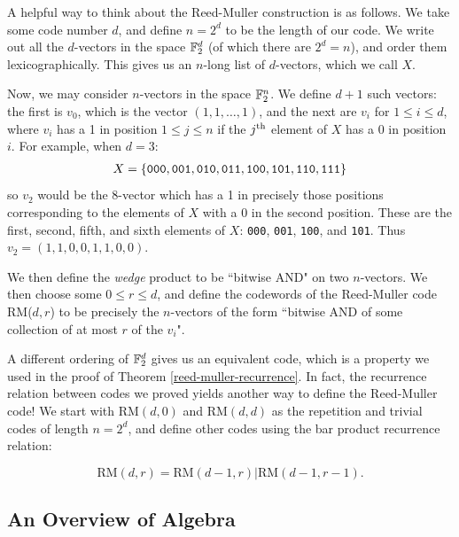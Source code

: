 \documentclass{article}
\begin{document}
\begin{remark}
    A helpful way to think about the Reed-Muller construction is as follows.
    We take some code number $d$, and define $n = 2^d$ to be the length of our code.
    We write out all the $d$-vectors in the space $\mathbb{F}_2^d$ (of which there are $2^d = n$), and order them lexicographically. This gives us an $n$-long list of $d$-vectors, which we call $X$.
    
    Now, we may consider $n$-vectors in the space $\mathbb{F}_2^n$. We define $d+1$ such vectors: the first is $v_0$, which is the vector $(1, 1, \dots, 1)$, and the next are $v_i$ for $1 \leq i \leq d$, where $v_i$ has a 1 in position $1 \leq j \leq n$ if the $j^{\text{th}}$ element of $X$ has a 0 in position $i$. For example, when $d = 3$:
    \begin{align*}
    	X = \left\lbrace 
		\texttt{000}, \texttt{001}, \texttt{010}, \texttt{011},
		\texttt{100}, \texttt{101}, \texttt{110}, \texttt{111}
		 \right\rbrace
	\end{align*}
	so $v_2$ would be the 8-vector which has a 1 in precisely those positions corresponding to the elements of $X$ with a 0 in the second position. These are the first, second, fifth, and sixth elements of $X$: 
	\texttt{000}, \texttt{001}, \texttt{100}, and \texttt{101}. Thus $v_2 = (1, 1, 0, 0, 1, 1, 0, 0)$.
	
	We then define the \textit{wedge} product to be ``bitwise AND" on two $n$-vectors. We then choose some $0 \leq r \leq d$, and define the codewords of the Reed-Muller code RM($d, r$) to be precisely the $n$-vectors of the form ``bitwise AND of some collection of at most $r$ of the $v_i$".
\end{remark}

\begin{note}
	A different ordering of $\mathbb{F}_2^d$ gives us an equivalent code, which is a property we used in the proof of Theorem \ref{reed-muller-recurrence}. In fact, the recurrence relation between codes we proved yields another way to define the Reed-Muller code! We start with $\mathrm{RM}(d, 0)$ and $\mathrm{RM}(d, d)$ as the repetition and trivial codes of length $n = 2^d$, and define other codes using the bar product recurrence relation:
\end{note}
\[
\mathrm{RM}(d, r) = \mathrm{RM}(d-1, r)|\mathrm{RM}(d-1, r-1).
\]


\pagebreak
\subsection{An Overview of Algebra}
\label{section-algebraic-grm-overview}
\end{document}
